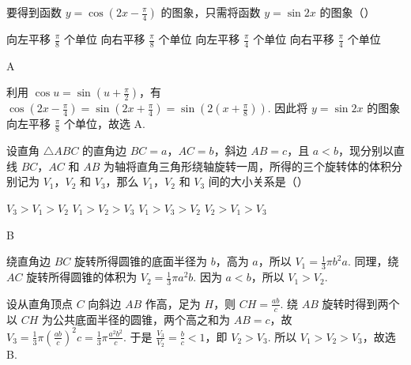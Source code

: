 \documentclass[UTF8,a4paper,oneside,11pt]{ctexbook}
\begin{document}
\begin{problem}
要得到函数 \(y=\cos\left( 2x-\frac{\pi}{4} \right)\) 的图象，只需将函数 \(y=\sin 2x\) 的图象（\quad）

\choices
    {向左平移 \(\frac{\pi}{8}\) 个单位}
    {向右平移 \(\frac{\pi}{8}\) 个单位}
    {向左平移 \(\frac{\pi}{4}\) 个单位}
    {向右平移 \(\frac{\pi}{4}\) 个单位}
\end{problem}

\begin{answer}
A
\end{answer}

\begin{solution}
利用 \(\cos u=\sin\left(u+\frac{\pi}{2}\right)\)，有 \(\cos\left(2x-\frac{\pi}{4}\right)=\sin\left(2x+\frac{\pi}{4}\right)=\sin\left(2\left(x+\frac{\pi}{8}\right)\right)\). 因此将 \(y=\sin2x\) 的图象向左平移 \(\frac{\pi}{8}\) 个单位，故选 A.
\end{solution}

\begin{problem}
设直角 \(\triangle ABC\) 的直角边 \(BC=a\)，\(AC=b\)，斜边 \(AB=c\)，且 \(a<b\)，现分别以直线 \(BC\)，\(AC\) 和 \(AB\) 为轴将直角三角形绕轴旋转一周，所得的三个旋转体的体积分别记为 \(V_1\)，\(V_2\) 和 \(V_3\)，那么 \(V_1\)，\(V_2\) 和 \(V_3\) 间的大小关系是（\quad）

\choices
    {\(V_3>V_1>V_2\)}
    {\(V_1>V_2>V_3\)}
    {\(V_1>V_3>V_2\)}
    {\(V_2>V_1>V_3\)}
\end{problem}

\begin{answer}
B
\end{answer}

\begin{solution}
绕直角边 \(BC\) 旋转所得圆锥的底面半径为 \(b\)，高为 \(a\)，所以 \(V_1=\frac{1}{3}\pi b^2a\). 同理，绕 \(AC\) 旋转所得圆锥的体积为 \(V_2=\frac{1}{3}\pi a^2b\). 因为 \(a<b\)，所以 \(V_1>V_2\).

设从直角顶点 \(C\) 向斜边 \(AB\) 作高，足为 \(H\)，则 \(CH=\frac{ab}{c}\). 绕 \(AB\) 旋转时得到两个以 \(CH\) 为公共底面半径的圆锥，两个高之和为 \(AB=c\)，故 \(V_3=\frac{1}{3}\pi\left(\frac{ab}{c}\right)^2c=\frac{1}{3}\pi\frac{a^2b^2}{c}\). 于是 \(\frac{V_3}{V_2}=\frac{b}{c}<1\)，即 \(V_2>V_3\). 所以 \(V_1>V_2>V_3\)，故选 B.
\end{solution}
\end{document}
